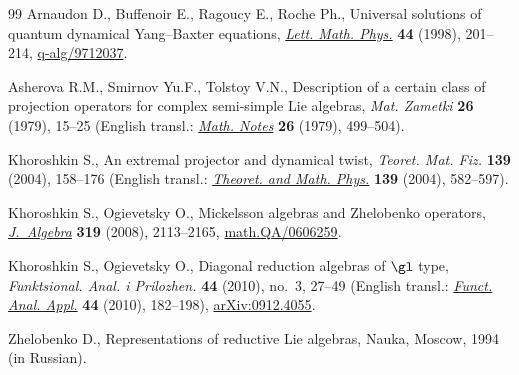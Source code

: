 \documentclass[11pt]{article}
\numberwithin{equation}{section}
\begin{document}
\begin{thebibliography}{99}
Arnaudon D., Buf\/fenoir E., Ragoucy E., Roche Ph.,
Universal solutions of quantum dynamical Yang--Baxter equations,
\href{http://dx.doi.org/10.1023/A:1007498022373}{{\it Lett. Math. Phys.}} {\bf 44} (1998), 201--214,
\href{http://arxiv.org/abs/q-alg/9712037}{q-alg/9712037}.

Asherova R.M., Smirnov Yu.F., Tolstoy V.N.,
Description of a certain class of projection operators for complex semi-simple Lie algebras,
{\it Mat. Zametki} {\bf 26} (1979), 15--25 (English transl.: \href{http://dx.doi.org/10.1007/BF01140268}{{\it Math. Notes}} {\bf 26} (1979),   499--504).


Khoroshkin S.,
An extremal projector and dynamical twist,
{\it Teoret. Mat. Fiz.} {\bf 139} (2004),  158--176
(English transl.: \href{http://dx.doi.org/10.1023/B:TAMP.0000022749.42512.fd}{{\it Theoret. and Math. Phys.}} {\bf 139} (2004),   582--597).


 Khoroshkin  S., Ogievetsky O.,
Mickelsson algebras and Zhelobenko operators,
\href{http://dx.doi.org/10.1016/j.jalgebra.2007.04.020}{{\it J.~Algebra}} {\bf 319} (2008), 2113--2165,
\href{http://arxiv.org/abs/math.QA/0606259}{math.QA/0606259}.

Khoroshkin  S., Ogievetsky O.,
Diagonal reduction algebras of $\gl$ type,
{\it Funktsional. Anal. i Prilozhen.} {\bf 44} (2010), no.~3, 27--49  (English transl.: \href{http://dx.doi.org/10.1007/s10688-010-0023-0}{{\it Funct. Anal. Appl.}} {\bf 44} (2010),  182--198),
\href{http://arxiv.org/abs/0912.4055}{arXiv:0912.4055}.

Zhelobenko D.,
Representations of reductive Lie algebras, Nauka, Moscow, 1994 (in Russian).

\end{thebibliography}
\end{document}
